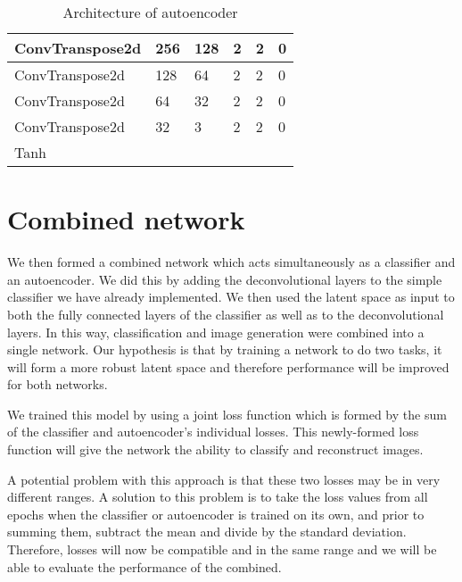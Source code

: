 \documentclass{l4proj}
\begin{document}
\begin{table}[ht!]
\begin{tabular}{|l|l|l|l|l|l|}
ConvTranspose2d & 256                   & 128                    & 2                     & 2               & 0                \\ \hline
ConvTranspose2d & 128                   & 64                     & 2                     & 2               & 0                \\ \hline
ConvTranspose2d & 64                    & 32                     & 2                     & 2               & 0                \\ \hline
ConvTranspose2d & 32                    & 3                      & 2                     & 2               & 0                \\ \hline
Tanh            &                       &                        &                       &                 &                  \\ \hline
\end{tabular}
\caption{Architecture of autoencoder}
\label{tab:autoencoder}
\end{table}



\section{Combined network}
\label{app:combined}
We then formed a combined network which acts simultaneously as a classifier and an autoencoder. We did this by adding the deconvolutional layers to the simple classifier we have already implemented. We then used the latent space as input to both the fully connected layers of the classifier as well as to the deconvolutional layers. In this way, classification and image generation were combined into a single network. Our hypothesis is that by training a network to do two tasks, it will form a more robust latent space and therefore performance will be improved for both networks.

We trained this model by using a joint loss function which is formed by the sum of the classifier and autoencoder's individual losses. This newly-formed loss function will give the network the ability to classify and reconstruct images.

A potential problem with this approach is that these two losses may be in very different ranges. A solution to this problem is to take the loss values from all epochs when the classifier or autoencoder is trained on its own, and prior to summing them, subtract the mean and divide by the standard deviation. Therefore, losses will now be compatible and in the same range and we will be able to evaluate the performance of the combined.
\end{document}
